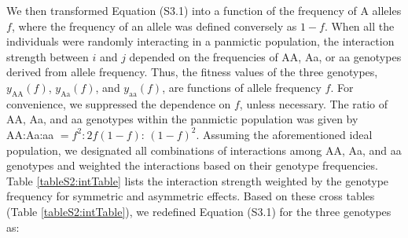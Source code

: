 \documentclass[12pt,]{article}
\begin{document}
We then transformed Equation (S3.1) into a function of the frequency of A alleles $f$, where the frequency of an allele was defined conversely as $1-f$. When all the individuals were randomly interacting in a panmictic population, the interaction strength between $i$ and $j$ depended on the frequencies of AA, Aa, or aa genotypes derived from allele frequency. Thus, the fitness values of the three genotypes, $y_\mathrm{AA}(f)$, $y_\mathrm{Aa}(f)$, and $y_\mathrm{aa}(f)$, are functions of allele frequency $f$. For convenience, we suppressed the dependence on $f$, unless necessary. The ratio of AA, Aa, and aa genotypes within the panmictic population was given by AA:Aa:aa $=f^2: 2f(1-f)$: $(1-f)^2$. Assuming the aforementioned ideal population, we designated all combinations of interactions among AA, Aa, and aa genotypes and weighted the interactions based on their genotype frequencies. Table \ref{tableS2:intTable} lists the interaction strength weighted by the genotype frequency for symmetric and asymmetric effects. Based on these cross tables (Table \ref{tableS2:intTable}), we redefined Equation (S3.1) for the three genotypes as: 
\end{document}
